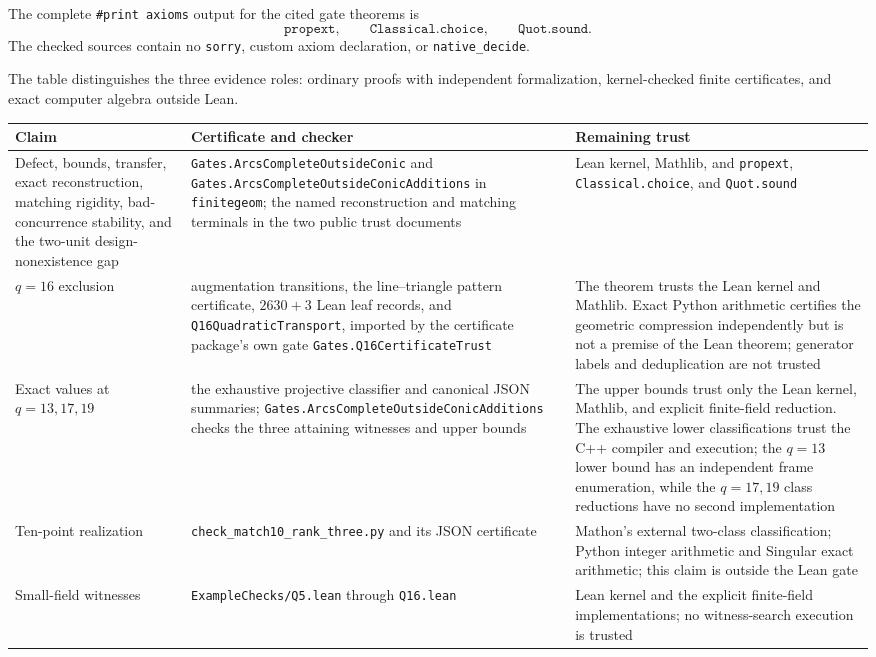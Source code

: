 \documentclass[11pt]{article}
\theoremstyle{definition}
\theoremstyle{remark}
\begin{document}
The complete \texttt{\#print axioms} output for the cited gate theorems is
\[
 \texttt{propext},\qquad \texttt{Classical.choice},\qquad
 \texttt{Quot.sound}.
\]
The checked sources contain no \texttt{sorry},
custom axiom declaration, or \texttt{native\_decide}.

The table distinguishes the three evidence roles: ordinary proofs with
independent formalization, kernel-checked finite certificates, and exact
computer algebra outside Lean.

\begin{center}
\small
\begin{tabular}{>{\raggedright\arraybackslash}p{}
                >{\raggedright\arraybackslash}p{}
                >{\raggedright\arraybackslash}p{}}
\hline
Claim & Certificate and checker & Remaining trust\\ \hline
Defect, bounds, transfer, exact reconstruction, matching rigidity,
bad-concurrence stability, and the two-unit design-nonexistence gap&
\texttt{Gates.ArcsCompleteOutside\allowbreak Conic} and
\texttt{Gates.ArcsCompleteOutside\allowbreak ConicAdditions} in
\texttt{finitegeom}; the named
reconstruction and matching terminals in the two public trust documents&
Lean kernel, Mathlib, and
\texttt{propext}, \texttt{Classical.choice}, and \texttt{Quot.sound}\\
\(q=16\) exclusion&
augmentation transitions, the line--triangle pattern certificate,
\(2630+3\) Lean leaf records, and
\texttt{Q16QuadraticTransport}, imported by the certificate package's own
gate \texttt{Gates.Q16CertificateTrust}&
The theorem trusts the Lean kernel and Mathlib.  Exact Python arithmetic
certifies the geometric compression independently but is not a premise of the
Lean theorem; generator labels and deduplication are not trusted\\
Exact values at \(q=13,17,19\)&
the exhaustive projective classifier and canonical JSON summaries;
\texttt{Gates.ArcsCompleteOutside\allowbreak ConicAdditions} checks the three
attaining witnesses and upper bounds&
The upper bounds trust only the Lean kernel, Mathlib, and explicit
finite-field reduction.  The exhaustive lower classifications trust the C++
compiler and execution; the \(q=13\) lower bound has an independent frame
enumeration, while the \(q=17,19\) class reductions have no second
implementation\\
Ten-point realization&
\texttt{check\_match10\_\allowbreak rank\_three.py} and its JSON certificate&
Mathon's external two-class classification; Python integer arithmetic and
Singular exact arithmetic; this claim is outside the Lean gate\\
Small-field witnesses&
\texttt{ExampleChecks/\allowbreak Q5.lean} through \texttt{Q16.lean}&
Lean kernel and the explicit finite-field implementations; no witness-search
execution is trusted\\ \hline
\end{tabular}
\end{center}
\end{document}
